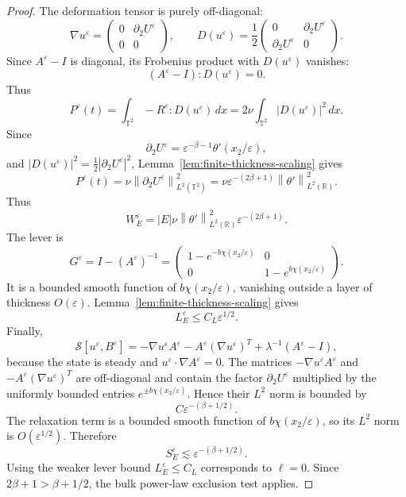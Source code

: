 \documentclass[11pt]{article}
\numberwithin{equation}{section}
\newcommand{\T}{\mathbb T}
\newcommand{\R}{\mathbb R}
\newcommand{\Id}{I}
\newcommand{\eps}{\varepsilon}
\newcommand{\norm}[1]{\left\lVert #1\right\rVert}
\begin{document}
\begin{proof}
The deformation tensor is purely off-diagonal:
\[
  \nabla u^\varepsilon
  =
  \begin{pmatrix}
  0&\partial_2U^\varepsilon\\
  0&0
  \end{pmatrix},
  \qquad
  D(u^\varepsilon)
  =
  \frac12
  \begin{pmatrix}
  0&\partial_2U^\varepsilon\\
  \partial_2U^\varepsilon&0
  \end{pmatrix}.
\]
Since \(A^\varepsilon-\Id\) is diagonal, its Frobenius product with
\(D(u^\varepsilon)\) vanishes:
\[
  (A^\varepsilon-\Id):D(u^\varepsilon)=0.
\]
Thus
\[
  P^\varepsilon(t)
  =
  \int_{\T^2}-R^\varepsilon:D(u^\varepsilon)\,dx
  =
  2\nu\int_{\T^2}|D(u^\varepsilon)|^2\,dx .
\]
Since
\[
  \partial_2U^\varepsilon
  =
  \varepsilon^{-\beta-1}\theta'(x_2/\varepsilon),
\]
and \(|D(u^\eps)|^2=\frac12|\partial_2U^\eps|^2\), Lemma~\ref{lem:finite-thickness-scaling}
gives
\[
  P^\eps(t)
  =
  \nu\norm{\partial_2U^\eps}_{L^2(\T^2)}^2
  =
  \nu\eps^{-(2\beta+1)}\norm{\theta'}_{L^2(\R)}^2.
\]
Thus
\[
  W_E^\eps
  =
  |E|\nu\norm{\theta'}_{L^2(\R)}^2
  \eps^{-(2\beta+1)}.
  \label{eq:W-exact-scale}
\]
The lever is
\[
  G^\varepsilon
  =
  \Id-(A^\varepsilon)^{-1}
  =
  \begin{pmatrix}
  1-e^{-b\chi(x_2/\eps)}&0\\
  0&1-e^{b\chi(x_2/\eps)}
  \end{pmatrix}.
\]
It is a bounded smooth function of \(b\chi(x_2/\eps)\), vanishing outside a
layer of thickness \(O(\eps)\).  Lemma~\ref{lem:finite-thickness-scaling} gives
\[
  L_E^\varepsilon\le C_L\eps^{1/2}.
  \label{eq:L-layer-scale}
\]
Finally,
\[
  \mathcal S[u^\varepsilon,B^\varepsilon]
  =
  -\nabla u^\varepsilon A^\varepsilon
  -A^\varepsilon(\nabla u^\varepsilon)^T
  +\lambda^{-1}(A^\varepsilon-\Id),
\]
because the state is steady and \(u^\varepsilon\cdot\nabla A^\varepsilon=0\).
The matrices \(-\nabla u^\varepsilon A^\varepsilon\) and
\(-A^\varepsilon(\nabla u^\varepsilon)^T\) are off-diagonal and contain the
factor \(\partial_2U^\varepsilon\) multiplied by the uniformly bounded
entries \(e^{\pm b\chi(x_2/\eps)}\).  Hence their \(L^2\) norm is bounded by
\[
  C\eps^{-(\beta+1/2)}.
\]
The relaxation term is a bounded smooth function of \(b\chi(x_2/\eps)\), so its
\(L^2\) norm is \(O(\eps^{1/2})\).  Therefore
\[
  S_E^\varepsilon\lesssim\varepsilon^{-(\beta+1/2)}.
\]
Using the weaker lever bound \(L_E^\varepsilon\le C_L\) corresponds to
\(\ell=0\).  Since \(2\beta+1>\beta+1/2\), the bulk power-law exclusion test
applies.
\end{proof}
\end{document}
